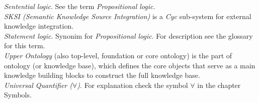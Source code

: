 \emph{Sentential logic}. See the term \emph{Propositional logic}.\\

\emph{SKSI (Semantic Knowledge Source Integration)} is a \emph{Cyc} sub-system
for external knowledge integration.\\

\emph{Statement logic}. Synonim for \emph{Propositional logic}. For description
see the glossary for this term.\\

\emph{Upper Ontology} (also top-level, foundation or core ontology) is the part
of ontology (or knowledge base), which defines the core objects that serve as a
main knowledge building blocks to construct the full knowledge base.\\

\emph{Universal Quantifier ($\forall$)}. For explanation check the symbol 
$\forall$ in the chapter Symbols. \\
